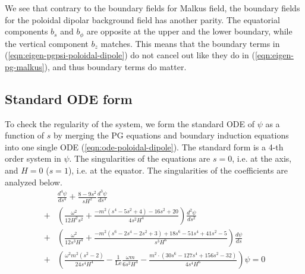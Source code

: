 We see that contrary to the boundary fields for Malkus field, the boundary fields for the poloidal dipolar background field has another parity.
The equatorial components $b_s$ and $b_\phi$ are opposite at the upper and the lower boundary, while the vertical component $b_z$ matches.
This means that the boundary terms in (\ref{eqn:eigen-pgpsi-poloidal-dipole}) do not cancel out like they do in (\ref{eqn:eigen-pg-malkus}), and thus boundary terms do matter.


\subsection{Standard ODE form}

To check the regularity of the system, we form the standard ODE of $\psi$ as a function of $s$ by merging the PG equations and boundary induction equations into one single ODE (\ref{eqn:ode-poloidal-dipole}).
The standard form is a 4-th order system in $\psi$. The singularities of the equations are $s=0$, i.e. at the axis, and $H=0$ ($s=1$), i.e. at the equator. The singularities of the coefficients are analyzed below.
\begin{equation}\label{eqn:ode-poloidal-dipole}
\begin{aligned}
    &\frac{d^{4}\psi}{d s^{4}} + \frac{8 - 9 s^{2}}{sH^{2}} \frac{d^{3}\psi}{d s^{3}} \\
    +& \left(\frac{\omega^{2}}{12 H^{2} s^{2}} + \frac{- m^{2} \left(s^{4} - 5 s^{2} + 4\right) - 16 s^{2} + 20}{4 s^{2} H^{4}}\right) \frac{d^{2}\psi}{d s^{2}} \\
    +& \left(\frac{\omega^{2}}{12 s^{3} H^{4}} + \frac{- m^{2} \left(s^{6} - 2 s^{4} - 2 s^{2} + 3\right) + 18 s^{6} - 51 s^{4} + 41 s^{2} - 5}{s^3 H^{6}}\right) \frac{d\psi}{d s} \\
    +& \left(\frac{\omega^{2} m^{2} \left(s^2 - 2\right)}{24 s^{4} H^{4}} - \frac{1}{\mathrm{Le}} \frac{\omega m}{6 s^{2} H^{4}} - \frac{m^{2} \cdot \left(30 s^{6} - 127 s^{4} + 156 s^{2} - 32\right)}{4 s^{4} H^{6}}\right) \psi = 0
\end{aligned}
\end{equation}

